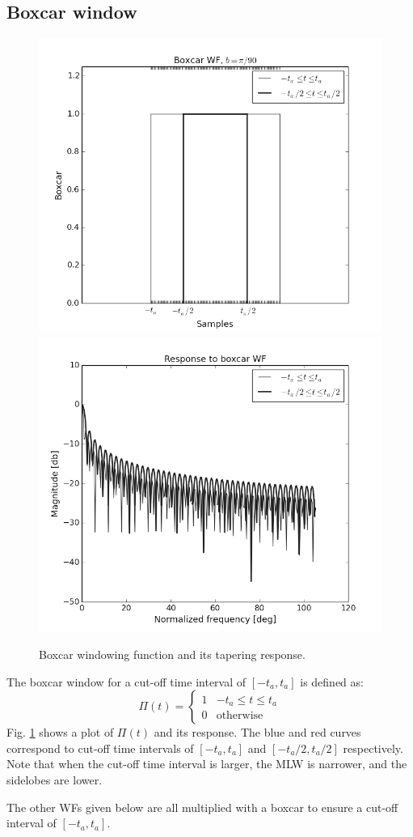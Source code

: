\documentclass[useAMS,usenatbib]{mn2e}
\begin{document}
\subsection{Boxcar window}
\begin{figure}
\includegraphics[width=.5\textwidth]{./Figures/boxcargrey.png}%
\includegraphics[width=.5\textwidth]{./Figures/freq_resp_boxgrey.png}
\caption{Boxcar windowing function and its tapering response.}\label{fig:wf:box}
\end{figure}
The boxcar window for a cut-off time interval of $[-t_a,t_a]$ is defined as:
\begin{equation}
\Pi(t)=\left\{
\begin{array}{rl}
1 & \mbox{$-t_a \leq t \leq t_a$} \\
0 & \mbox{otherwise}
\end{array}\right.
\end{equation}
Fig. \ref{fig:wf:box} shows a plot of $\Pi(t)$ and its response. The blue and red curves 
correspond to cut-off time intervals of $[-t_a, t_a]$ and 
$[-t_a/2,t_a/2]$ respectively. Note that when the cut-off time interval is larger, the MLW is 
narrower, and the sidelobes are lower.

The other WFs given below are all multiplied with a boxcar to ensure a cut-off interval of $[-t_a,t_a]$.
\end{document}
